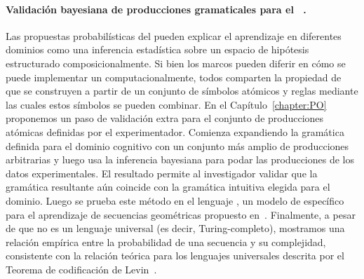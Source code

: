 \paragraph{Validación bayesiana de producciones gramaticales para el \lot~\cite{romano2018bayesian}.} 
Las propuestas probabilísticas del \lot pueden explicar el aprendizaje en diferentes dominios como una inferencia estadística sobre un espacio de hipótesis estructurado composicionalmente. Si bien los marcos pueden diferir en cómo se puede implementar un \lot computacionalmente, todos comparten la propiedad de que se construyen a partir de un conjunto de símbolos atómicos y reglas mediante las cuales estos símbolos se pueden combinar. En el Capítulo~\ref{chapter:PO} proponemos un paso de validación extra para el conjunto de producciones atómicas definidas por el experimentador. Comienza expandiendo la gramática \lot definida para el dominio cognitivo con un conjunto más amplio de producciones arbitrarias y luego usa la inferencia bayesiana para podar las producciones de los datos experimentales. El resultado permite al investigador validar que la gramática resultante aún coincide con la gramática intuitiva elegida para el dominio. Luego se prueba este método en el lenguaje \gramgeo, un modelo de \lot específico para el aprendizaje de secuencias geométricas propuesto en~\cite{amalric2017language}. Finalmente, a pesar de que \gramgeo no es un lenguaje universal (es decir, Turing-completo), mostramos una relación empírica entre la probabilidad de una secuencia y su complejidad, consistente con la relación teórica para los lenguajes universales descrita por el Teorema de codificación de Levin~\cite{levin1974laws}.


